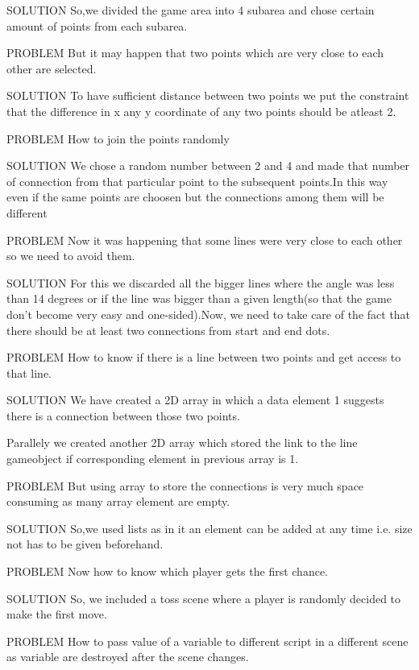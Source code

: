 \documentclass[11pt]{article}
\begin{document}
{\color{green}SOLUTION }So,we divided the game area into 4 subarea and chose certain amount of points from each subarea.

{\color{red}PROBLEM }But it may happen that two points which are very close to each other are selected.

{\color{green}SOLUTION }To have sufficient distance between two points we put the constraint that the difference in x any y coordinate of any two points should be atleast 2.

{\color{red}PROBLEM }How to join the points randomly 

{\color{green}SOLUTION }We chose a random number between 2 and 4 and made that number of connection from that particular point to the subsequent points.In this way even if the same points are choosen but the connections among them will be different

{\color{red}PROBLEM }Now it was happening that some lines were very close to each other so we need to avoid them.

{\color{green}SOLUTION }For this we discarded all the bigger lines where the angle was less than 14 degrees or if the line was bigger than a given length(so that the game don’t become very easy and one-sided).Now, we need to take care of the fact that there should be at least two connections from start and end dots.

{\color{red}PROBLEM }How to know if there is a line between two points and get access to that line.

{\color{green}SOLUTION }We have created a 2D array in which a data element 1 suggests there is a connection between those two points.

Parallely we created another 2D array which stored the link to the line gameobject if corresponding element in previous array is 1.

{\color{red}PROBLEM }But  using array to store the connections is very much space consuming as many array element are empty.

{\color{green}SOLUTION }So,we used lists as in it an element can be added at any time i.e. size not has to be given beforehand.

{\color{red}PROBLEM }Now how to know which player gets the first chance.

{\color{green}SOLUTION }So, we included a toss scene where a player is randomly decided to make the first move.

{\color{red}PROBLEM }How to pass value of a variable to different script in a different scene as variable are destroyed after the scene changes.
\end{document}
